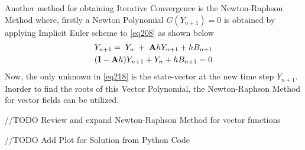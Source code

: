 Another method for obtaining Iterative Convergence is the Newton-Raphson Method where, firstly a Newton Polynomial $G(Y_{n+1}) = 0$ is obtained by applying Implicit Euler scheme to \cref{eq208} as shown below 
\begin{gather}\label{eq218}
Y_{n+1} =\; Y_{n} \;+ \;  \mathbf{A} h Y_{n+1} + h B_{n+1} \notag \\
(\mathbf{I} - \mathbf{A} h) Y_{n+1} + Y_{n} + h B_{n+1} = 0 
\end{gather}
Now, the only unknown in \cref{eq218} is the state-vector at the new time step $Y_{n+1}$. Inorder to find the roots of this Vector Polynomial, the Newton-Raphson Method for vector fields can be utilized. 

//TODO Review and expand Newton-Raphson Method for vector functions

//TODO Add Plot for Solution from Python Code

